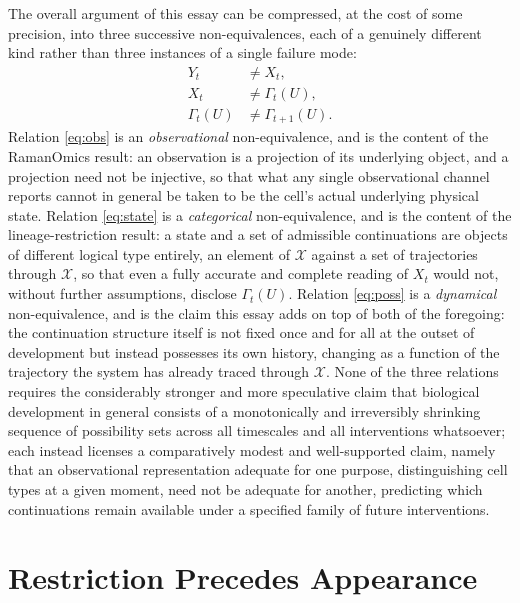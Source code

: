\documentclass[11pt]{article}
\begin{document}
The overall argument of this essay can be compressed, at the cost of some precision, into three successive non-equivalences, each of a genuinely different kind rather than three instances of a single failure mode:
\begin{align}
Y_t &\neq X_t, \label{eq:obs}\\
X_t &\neq \Gamma_t(U), \label{eq:state}\\
\Gamma_t(U) &\neq \Gamma_{t+1}(U). \label{eq:poss}
\end{align}
Relation \eqref{eq:obs} is an \emph{observational} non-equivalence, and is the content of the RamanOmics result: an observation is a projection of its underlying object, and a projection need not be injective, so that what any single observational channel reports cannot in general be taken to be the cell's actual underlying physical state. Relation \eqref{eq:state} is a \emph{categorical} non-equivalence, and is the content of the lineage-restriction result: a state and a set of admissible continuations are objects of different logical type entirely, an element of $\mathcal{X}$ against a set of trajectories through $\mathcal{X}$, so that even a fully accurate and complete reading of $X_t$ would not, without further assumptions, disclose $\Gamma_t(U)$. Relation \eqref{eq:poss} is a \emph{dynamical} non-equivalence, and is the claim this essay adds on top of both of the foregoing: the continuation structure itself is not fixed once and for all at the outset of development but instead possesses its own history, changing as a function of the trajectory the system has already traced through $\mathcal{X}$. None of the three relations requires the considerably stronger and more speculative claim that biological development in general consists of a monotonically and irreversibly shrinking sequence of possibility sets across all timescales and all interventions whatsoever; each instead licenses a comparatively modest and well-supported claim, namely that an observational representation adequate for one purpose, distinguishing cell types at a given moment, need not be adequate for another, predicting which continuations remain available under a specified family of future interventions.

\section{Restriction Precedes Appearance}
\end{document}
